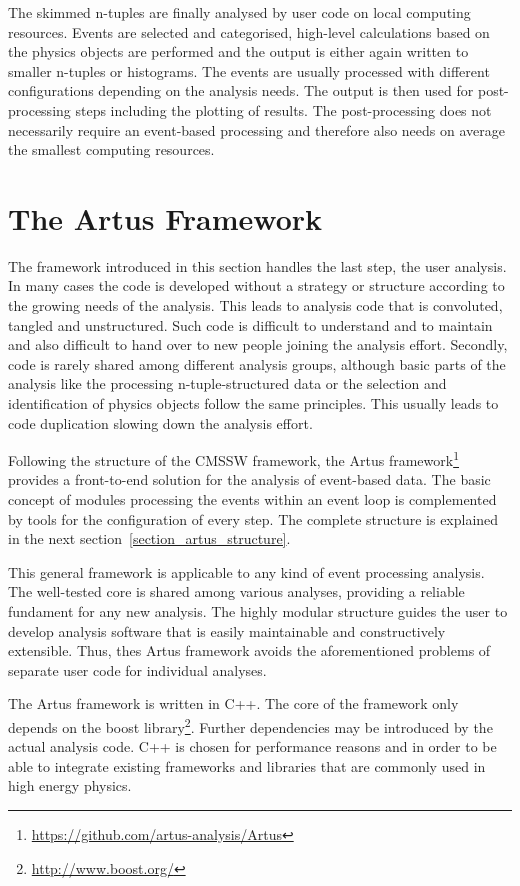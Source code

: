 \documentclass[3p]{elsarticle}
\begin{document}
The skimmed n-tuples are finally analysed by user code on local computing resources. Events are selected and categorised, high-level calculations based on the physics objects are performed and the output is either again written to smaller n-tuples or histograms. The events are usually processed with different configurations depending on the analysis needs. The output is then used for post-processing steps including the plotting of results. The post-processing does not necessarily require an event-based processing and therefore also needs on average the smallest computing resources.


\section{The Artus Framework \label{section_artus_motivation}}

The framework introduced in this section handles the last step, the user analysis. In many cases the code is developed without a strategy or structure according to the growing needs of the analysis. This leads to analysis code that is convoluted, tangled and unstructured. Such code is difficult to understand and to maintain and also difficult to hand over to new people joining the analysis effort. Secondly, code is rarely shared among different analysis groups, although basic parts of the analysis like the processing n-tuple-structured data or the selection and identification of physics objects follow the same principles. This usually leads to code duplication slowing down the analysis effort.

Following the structure of the CMSSW framework, the Artus framework\footnote{\url{https://github.com/artus-analysis/Artus}} provides a front-to-end solution for the analysis of event-based data. The basic concept of modules processing the events within an event loop is complemented by tools for the configuration of every step. The complete structure is explained in the next section~\ref{section_artus_structure}.

This general framework is applicable to any kind of event processing analysis. The well-tested core is shared among various analyses, providing a reliable fundament for any new analysis. The highly modular structure guides the user to develop analysis software that is easily maintainable and constructively extensible. Thus, thes Artus framework avoids the aforementioned problems of separate user code for individual analyses.

The Artus framework is written in C++. The core of the framework only depends on the boost library\footnote{\url{http://www.boost.org/}}. Further dependencies may be introduced by the actual analysis code. C++ is chosen for performance reasons and in order to be able to integrate existing frameworks and libraries that are commonly used in high energy physics.
\end{document}
